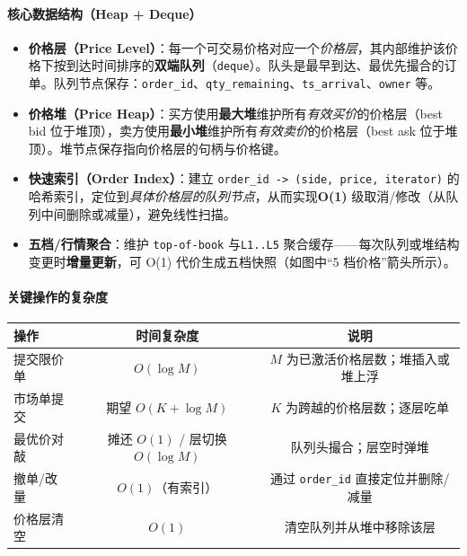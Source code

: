 \documentclass{mancls}
\begin{document}
\paragraph{核心数据结构（Heap + Deque）}
\begin{itemize}
  \item \textbf{价格层（Price Level）}：每一个可交易价格对应一个\emph{价格层}，其内部维护该价格下按到达时间排序的\textbf{双端队列}（\verb|deque|）。队头是最早到达、最优先撮合的订单。队列节点保存：\verb|order_id|、\verb|qty_remaining|、\verb|ts_arrival|、\verb|owner| 等。
  \item \textbf{价格堆（Price Heap）}：买方使用\textbf{最大堆}维护所有\emph{有效买价}的价格层（best bid 位于堆顶），卖方使用\textbf{最小堆}维护所有\emph{有效卖价}的价格层（best ask 位于堆顶）。堆节点保存指向价格层的句柄与价格键。
  \item \textbf{快速索引（Order Index）}：建立 \verb|order_id -> (side, price, iterator)| 的哈希索引，定位到\emph{具体价格层的队列节点}，从而实现\textbf{O(1)} 级取消/修改（从队列中间删除或减量），避免线性扫描。
  \item \textbf{五档/行情聚合}：维护 \verb|top-of-book| 与\verb|L1..L5| 聚合缓存——每次队列或堆结构变更时\textbf{增量更新}，可 O(1) 代价生成五档快照（如图中“5 档价格”箭头所示）。
\end{itemize}

\paragraph{关键操作的复杂度}
\begin{center}
\begin{tabular}{lcc}
\hline
操作 & 时间复杂度 & 说明 \\
\hline
提交限价单 & $O(\log M)$ & $M$ 为已激活价格层数；堆插入或堆上浮 \\
市场单提交 & 期望 $O(K + \log M)$ & $K$ 为跨越的价格层数；逐层吃单 \\
最优价对敲 & 摊还 $O(1)$ / 层切换 $O(\log M)$ & 队列头撮合；层空时弹堆 \\
撤单/改量 & $O(1)$（有索引） & 通过 \verb|order_id| 直接定位并删除/减量 \\
价格层清空 & $O(1)$ & 清空队列并从堆中移除该层 \\
\hline
\end{tabular}
\end{center}
\end{document}
